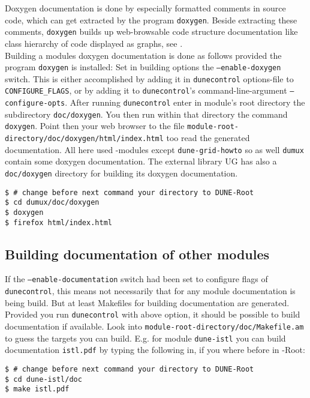 Doxygen documentation is done by especially formatted comments in source code, which can get extracted by the program 
\texttt{doxygen}. Beside extracting these comments, \texttt{doxygen} builds up web-browsable code structure documentation
like class hierarchy of code displayed as graphs, see \cite{DOXYGEN-HP}.\\

Building a modules doxygen documentation is done as follows provided the program \texttt{doxygen} is installed:
Set in building options the \texttt{--enable-doxygen} switch.
This is either accomplished by adding it in \texttt{dunecontrol} options-file to  \texttt{CONFIGURE\_FLAGS}, or by adding
it to  \texttt{dunecontrol}'s command-line-argument \texttt{--configure-opts}. 
After running \texttt{dunecontrol} enter in module's root directory the subdirectory \texttt{doc/doxygen}.
You then run within that directory the command \texttt{doxygen}. Point then your web browser to the file 
\texttt{module-root-directory/doc/doxygen/html/index.html} too read the generated documentation.
All here used \Dune-modules except \texttt{dune-grid-howto} so as well \texttt{dumux} contain some doxygen documentation.
The external library UG has also a \texttt{doc/doxygen} directory for building its doxygen documentation.

\begin{lstlisting}[style=Bash]
$ # change before next command your directory to DUNE-Root
$ cd dumux/doc/doxygen
$ doxygen
$ firefox html/index.html
\end{lstlisting}

\subsection{Building documentation of other \Dune modules}

If the \texttt{--enable-documentation} switch had been set to configure flags of
\texttt{dunecontrol}, this means not necessarily that for any 
\Dune module documentation is being build.
But at least Makefiles for building documentation are generated.
Provided you run \texttt{dunecontrol} with above option,
it should be possible to build documentation if available.
Look into \texttt{module-root-directory/doc/Makefile.am} to guess the targets you can build.
E.g. for module \texttt{dune-istl} you can build documentation \texttt{istl.pdf} by typing the following in,
if you where before in \Dune-Root:

\begin{lstlisting}[style=Bash]
$ # change before next command your directory to DUNE-Root
$ cd dune-istl/doc
$ make istl.pdf
\end{lstlisting}

